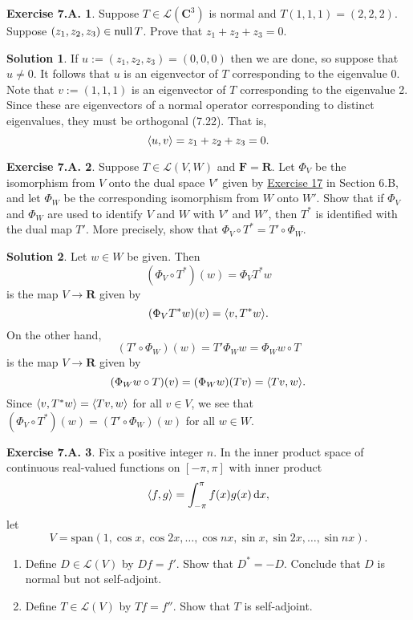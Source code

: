 \documentclass[12pt]{article}
\theoremstyle{definition}
\theoremstyle{exercise}
\newtheorem{exercise}{Exercise 7.A.}
\theoremstyle{solution}
\newtheorem*{solution}{Solution}
\newcommand{\upd}{\,\text{d}}
\newcommand{\lmap}{\mathcal{L}}
\newcommand{\Span}{\text{span}}
\newcommand{\Null}{\text{null\,}}
\newcommand{\R}{\mathbf{R}}
\newcommand{\C}{\mathbf{C}}
\newcommand{\F}{\mathbf{F}}
\DeclarePairedDelimiter\ip{\langle}{\rangle}
\begin{document}
\begin{exercise}
\label{ex:19}
    Suppose \( T \in \lmap(\C^3) \) is normal and \( T(1, 1, 1) = (2, 2, 2) \). Suppose \( (z_1, z_2, z_3) \in \Null T \). Prove that \( z_1 + z_2 + z_3 = 0 \).
\end{exercise}

\begin{solution}
    If \( u := (z_1, z_2, z_3) = (0, 0, 0) \) then we are done, so suppose that \( u \neq 0 \). It follows that \( u \) is an eigenvector of \( T \) corresponding to the eigenvalue 0. Note that \( v := (1, 1, 1) \) is an eigenvector of \( T \) corresponding to the eigenvalue 2. Since these are eigenvectors of a normal operator corresponding to distinct eigenvalues, they must be orthogonal (7.22). That is,
    \[
        \ip{u, v} = z_1 + z_2 + z_3 = 0.
    \]
\end{solution}

\begin{exercise}
\label{ex:20}
    Suppose \( T \in \lmap(V, W) \) and \( \F = \R \). Let \( \Phi_V \) be the isomorphism from \( V \) onto the dual space \( V' \) given by \href{https://lew98.github.io/Mathematics/LADR_Section_6_B_Exercises.pdf}{Exercise 17} in Section 6.B, and let \( \Phi_W \) be the corresponding isomorphism from \( W \) onto \( W' \). Show that if \( \Phi_V \) and \( \Phi_W \) are used to identify \( V \) and \( W \) with \( V' \) and \( W' \), then \( T^* \) is identified with the dual map \( T' \). More precisely, show that \( \Phi_V \circ T^* = T' \circ \Phi_W \).
\end{exercise}

\begin{solution}
    Let \( w \in W \) be given. Then
    \[
        (\Phi_V \circ T^*)(w) = \Phi_V T^* w
    \]
    is the map \( V \to \R \) given by
    \[
        (\Phi_V T^* w)(v) = \ip{v, T^* w}.
    \]
    On the other hand,
    \[
        (T' \circ \Phi_W)(w) = T' \Phi_W w = \Phi_W w \circ T
    \]
    is the map \( V \to \R \) given by
    \[
        (\Phi_W w \circ T)(v) = (\Phi_W w)(Tv) = \ip{Tv, w}.
    \]
    Since \( \ip{v, T^* w} = \ip{Tv, w} \) for all \( v \in V \), we see that \( (\Phi_V \circ T^*)(w) = (T' \circ \Phi_W)(w) \) for all \( w \in W \).
\end{solution}

\begin{exercise}
\label{ex:21}
    Fix a positive integer \( n \). In the inner product space of continuous real-valued functions on \( [-\pi, \pi] \) with inner product
    \[
        \ip{f, g} = \int_{-\pi}^{\pi} f(x) g(x) \upd x,
    \]
    let
    \[
        V = \Span(1, \cos x, \cos 2x, \ldots, \cos nx, \sin x, \sin 2x, \ldots, \sin nx).
    \]
    \begin{enumerate}
        \item Define \( D \in \lmap(V) \) by \( Df = f' \). Show that \( D^* = -D \). Conclude that \( D \) is normal but not self-adjoint.

        \item Define \( T \in \lmap(V) \) by \( Tf = f'' \). Show that \( T \) is self-adjoint.
    \end{enumerate}
\end{exercise}
\end{document}
